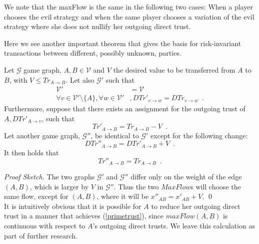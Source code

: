\documentclass[11pt]{llncs}
\theoremstyle{definition}
\newenvironment{proofsketch}{\textit{Proof Sketch.}}{\qed \smallskip \ \\}
\begin{document}
     We note that the maxFlow is the same in the following two cases: When a player chooses the evil strategy and when the
     same player chooses a variation of the evil strategy where she does not nullify her outgoing direct trust.

     Here we see another important theorem that gives the basis for risk-invariant transactions between different, possibly
     unknown, parties.
     \begin{theorem}
     \label{riskinv}
        Let $\mathcal{G}$ game graph, $A, B \in \mathcal{V}$ and $V$ the desired value to be transferred from $A$ to $B$,
        with $V \leq Tr_{A \rightarrow B}$. Let also $\mathcal{G}'$ such that
        \begin{align*}
           \mathcal{V}' &= \mathcal{V} \\
           \forall v \in \mathcal{V}' \setminus \{A\}, \forall w \in \mathcal{V}'&, DTr'_{v \rightarrow w} =
           DTr_{v \rightarrow w} \enspace.
        \end{align*}
        Furthermore, suppose that there exists an assignment for the outgoing trust of $A, DTr'_{A \rightarrow v}$, such that
        \begin{equation}
        \label{primetrust}
           Tr'_{A \rightarrow B} = Tr_{A \rightarrow B} - V \enspace.
        \end{equation}
        Let another game graph, $\mathcal{G}''$, be identical to $\mathcal{G}'$ except for the following change:
        \begin{equation*}
           DTr''_{A \rightarrow B} = DTr'_{A \rightarrow B} + V \enspace.
        \end{equation*}
        It then holds that
        \begin{equation*}
           Tr''_{A \rightarrow B} = Tr_{A \rightarrow B} \enspace.
        \end{equation*}
     \end{theorem}
     \begin{proofsketch}
        The two graphs $\mathcal{G}'$ and $\mathcal{G}''$ differ only on the weight of the edge $\left(A, B\right)$, which is
        larger by $V$ in $\mathcal{G}''$. Thus the two $MaxFlow$s will choose the same flow, except for $\left(A, B\right)$,
        where it will be $x''_{AB} = x'_{AB} + V$.
     \end{proofsketch}
     It is intuitively obvious that it is possible for $A$ to reduce her outgoing direct trust in a manner that achieves
     (\ref{primetrust}), since $maxFlow\left(A, B\right)$ is continuous with respect to $A$'s outgoing direct trusts. We
     leave this calculation as part of further research.
\end{document}
